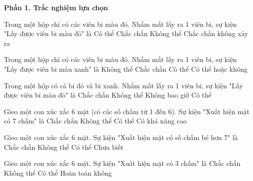 \textbf{Phần 1. Trắc nghiệm lựa chọn}

\begin{ex} %
Trong một hộp chỉ có các viên bi màu đỏ. Nhắm mắt lấy ra 1 viên bi, sự kiện "Lấy được viên bi màu đỏ" là
\choice
{Có thể}
{\True Chắc chắn}
{Không thể}
{Chắc chắn không xảy ra}
\end{ex}

\begin{ex} %
Trong một hộp chỉ có các viên bi màu đỏ. Nhắm mắt lấy ra 1 viên bi, sự kiện "Lấy được viên bi màu xanh" là
\choice
{\True Không thể}
{Chắc chắn}
{Có thể}
{Có thể hoặc không}
\end{ex}

\begin{ex} %
Trong một hộp có cả bi đỏ và bi xanh. Nhắm mắt lấy ra 1 viên bi, sự kiện "Lấy được viên bi màu đỏ" là
\choice
{Chắc chắn}
{Không thể}
{Không bao giờ}
{\True Có thể}
\end{ex}

\begin{ex} %
Gieo một con xúc xắc 6 mặt (có các số chấm từ 1 đến 6). Sự kiện "Xuất hiện mặt có 7 chấm" là
\choice
{Chắc chắn}
{\True Không thể}
{Có thể}
{Có khả năng cao}
\end{ex}

\begin{ex} %
Gieo một con xúc xắc 6 mặt. Sự kiện "Xuất hiện mặt có số chấm bé hơn 7" là
\choice
{\True Chắc chắn}
{Không thể}
{Có thể}
{Chưa biết}
\end{ex}

\begin{ex} %
Gieo một con xúc xắc 6 mặt. Sự kiện "Xuất hiện mặt có 3 chấm" là
\choice
{Chắc chắn}
{Không thể}
{\True Có thể}
{Hoàn toàn không}
\end{ex}

